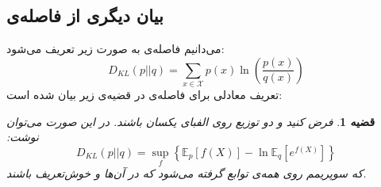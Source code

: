 \documentclass[a4paper,12pt]{article}
\newtheorem{thm}{{\large\bf قضیه}}[section]
\newcommand{\E}{\mathbb{E}}
\begin{document}
	\subsection{بیان دیگری از فاصله‌ی
		}
	می‌دانیم فاصله‌ی
	به صورت زیر تعریف می‌شود:
	\begin{equation}
	D_{KL}(p||q) = \sum_{x\in \mathcal{X}} p(x)\ln(\frac{p(x)}{q(x)})
	\end{equation}
	تعریف معادلی برای فاصله‌ی
	در قضیه‌ی زیر بیان شده است:
	\begin{thm}\label{thm_kldiv}
		فرض کنید 
		و
		دو توزیع روی الفبای یکسان
		باشند. در این صورت می‌توان نوشت:
		\begin{equation}
		D_{KL}(p||q) = \sup_f \left\{\E_p[f(X)] - \ln \E_q[e^{f(X)}]\right\}
		\end{equation}
		که سوپریمم روی همه‌ی توابع
		گرفته می‌شود که در آن‌ها
		\lr{$\E_p[f(X)]$}
		و
		\lr{$\E_q[e^{f(X)}]$}
		خوش‌تعریف باشند.
	\end{thm}
\end{document}
